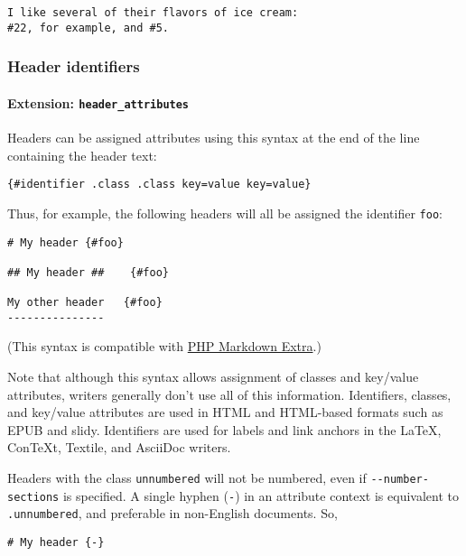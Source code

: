 \documentclass[]{article}
\let\oldparagraph\paragraph
\renewcommand{\paragraph}[1]{\oldparagraph{#1}\mbox{}}
\begin{document}
\begin{verbatim}
I like several of their flavors of ice cream:
#22, for example, and #5.
\end{verbatim}

\hypertarget{header-identifiers}{\subsubsection{Header
identifiers}\label{header-identifiers}}

\paragraph{\texorpdfstring{Extension:
\texttt{header\_attributes}}{Extension: header\_attributes}}\label{extension-header_attributes}

Headers can be assigned attributes using this syntax at the end of the
line containing the header text:

\begin{verbatim}
{#identifier .class .class key=value key=value}
\end{verbatim}

Thus, for example, the following headers will all be assigned the
identifier \texttt{foo}:

\begin{verbatim}
# My header {#foo}

## My header ##    {#foo}

My other header   {#foo}
---------------
\end{verbatim}

(This syntax is compatible with
\href{https://michelf.ca/projects/php-markdown/extra/}{PHP Markdown
Extra}.)

Note that although this syntax allows assignment of classes and
key/value attributes, writers generally don't use all of this
information. Identifiers, classes, and key/value attributes are used in
HTML and HTML-based formats such as EPUB and slidy. Identifiers are used
for labels and link anchors in the LaTeX, ConTeXt, Textile, and AsciiDoc
writers.

Headers with the class \texttt{unnumbered} will not be numbered, even if
\texttt{-\/-number-sections} is specified. A single hyphen (\texttt{-})
in an attribute context is equivalent to \texttt{.unnumbered}, and
preferable in non-English documents. So,

\begin{verbatim}
# My header {-}
\end{verbatim}
\end{document}
